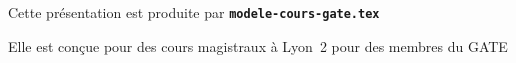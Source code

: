 
  \item Cette présentation est produite par \texttt{\textbf{modele-cours-gate.tex}}
  \item Elle est conçue pour des cours magistraux à Lyon~2 pour des membres du GATE
